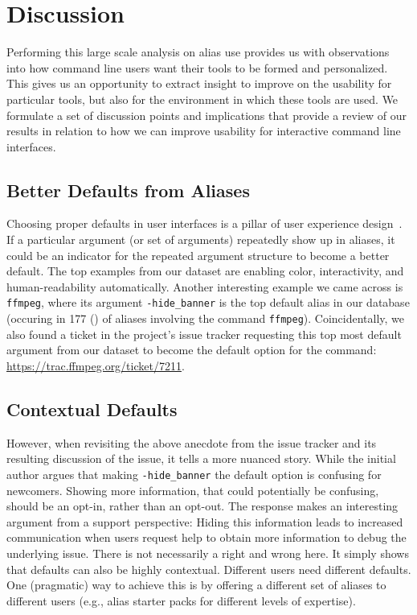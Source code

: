 \section{Discussion}

Performing this large scale analysis on alias use provides us with observations into how command line users want their tools to be formed and personalized.
This gives us an opportunity to extract insight to improve on the usability for particular tools, but also for the environment in which these tools are used.
We formulate a set of discussion points and implications that provide a review of our results in relation to how we can improve usability for interactive command line interfaces.

\subsection{Better Defaults from Aliases}

Choosing proper defaults in user interfaces is a pillar of user experience design~\cite{nielsen2005power}. 
If a particular argument (or set of arguments) repeatedly show up in aliases, it could be an indicator for the repeated argument structure to become a better default. 
The top examples from our dataset are enabling color, interactivity, and human-readability automatically.
Another interesting example we came across is \verb|ffmpeg|, where its argument \verb|-hide_banner| is the top default alias in our database (occuring in \num{177} () of aliases involving the command \verb|ffmpeg|).
Coincidentally, we also found a ticket in the project's issue tracker requesting this top most default argument from our dataset to become the default option for the command: \url{https://trac.ffmpeg.org/ticket/7211}.


\subsection{Contextual Defaults}

However, when revisiting the above anecdote from the issue tracker and its resulting discussion of the issue, it tells a more nuanced story.
While the initial author argues that making \verb|-hide_banner| the default option is confusing for newcomers.
Showing more information, that could potentially be confusing, should be an opt-in, rather than an opt-out.
The response makes an interesting argument from a support perspective: Hiding this information leads to increased communication when users request help to obtain more information to debug the underlying issue.
There is not necessarily a right and wrong here.
It simply shows that defaults can also be highly contextual.
Different users need different defaults.
One (pragmatic) way to achieve this is by offering a different set of aliases to different users (e.g., alias starter packs for different levels of expertise).

